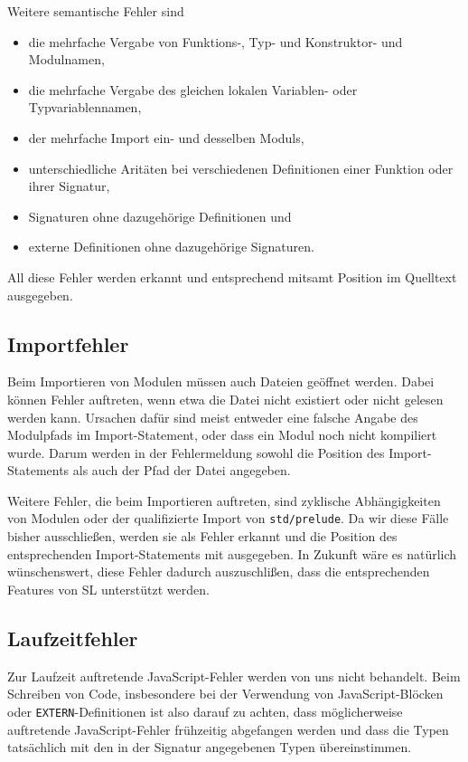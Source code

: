 \documentclass[runningheads]{llncs}
\begin{document}
Weitere semantische Fehler sind 
\begin{itemize}
\item die mehrfache Vergabe von Funktions-, Typ- und Konstruktor- und
  Modulnamen,
\item die mehrfache Vergabe des gleichen lokalen Variablen- oder
  Typvariablennamen,
\item der mehrfache Import ein- und desselben Moduls,
\item unterschiedliche Aritäten bei verschiedenen Definitionen einer
  Funktion oder ihrer Signatur,
\item Signaturen ohne dazugehörige Definitionen und
\item externe Definitionen ohne dazugehörige Signaturen.
\end{itemize}
All diese Fehler werden erkannt und entsprechend mitsamt Position im
Quelltext ausgegeben.

\subsection{Importfehler}
Beim Importieren von Modulen müssen auch Dateien geöffnet
werden.  Dabei können Fehler auftreten, wenn etwa die Datei nicht
existiert oder nicht gelesen werden kann.  Ursachen dafür sind meist
entweder eine falsche Angabe des Modulpfads im Import-Statement, oder
dass ein Modul noch nicht kompiliert wurde.  Darum werden in der
Fehlermeldung sowohl die Position des Import-Statements als auch der
Pfad der Datei angegeben.

Weitere Fehler, die beim Importieren auftreten, sind zyklische
Abhängigkeiten von Modulen oder der qualifizierte Import von
\texttt{std/prelude}.  Da wir diese Fälle bisher ausschließen, werden
sie als Fehler erkannt und die Position des entsprechenden
Import-Statements mit ausgegeben.  In Zukunft wäre es natürlich
wünschenswert, diese Fehler dadurch auszuschlißen, dass die
entsprechenden Features von SL unterstützt werden.

\subsection{Laufzeitfehler}
Zur Laufzeit auftretende JavaScript-Fehler werden von uns nicht
behandelt. Beim Schreiben von Code, insbesondere bei der
Verwendung von JavaScript-Blöcken oder \verb|EXTERN|-Definitionen ist
also darauf zu achten, dass möglicherweise auftretende
JavaScript-Fehler frühzeitig abgefangen werden und dass die Typen
tatsächlich mit den in der Signatur angegebenen Typen übereinstimmen.
\end{document}
